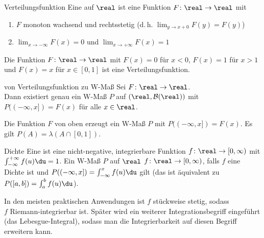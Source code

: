 \begin{Def}{Verteilungsfunktion}
    Eine  auf $\real$ ist eine Funktion
    $F\colon \real \rightarrow \real$ mit
    \begin{enumerate}
        \item
        $F$ monoton wachsend und rechtsstetig (d.\,h. $\lim_{y \to x+0} F(y) = F(y)$)

        \item
        $\lim_{x \to -\infty} F(x) = 0$ und $\lim_{x \to +\infty} F(x) = 1$
    \end{enumerate}
\end{Def}

\begin{Bsp}
    Die Funktion $F\colon \real \rightarrow \real$ mit
    $F(x) = 0$ für $x < 0$, $F(x) = 1$ für $x > 1$ und
    $F(x) = x$ für $x \in [0, 1]$ ist eine Verteilungsfunktion.
\end{Bsp}

\begin{Satz}{von Verteilungsfunktion zu W-Maß}
    Sei $F\colon \real \rightarrow \real$.\\
    Dann existiert genau ein W-Maß $P$ auf $(\real, \B(\real))$ mit $P((-\infty, x]) = F(x)$
    für alle $x \in \real$.
\end{Satz}

\begin{Bsp}
    Die Funktion $F$ von oben erzeugt ein W-Maß $P$ mit $P((-\infty, x]) = F(x)$.
    Es gilt $P(A) = \lambda(A \cap [0, 1])$.
\end{Bsp}

\linie

\begin{Def}{Dichte}
    Eine  ist eine nicht-negative, integrierbare Funktion
    $f\colon \real \rightarrow [0, \infty)$ mit $\int_{-\infty}^{+\infty} f(u)\du = 1$.
    Ein W-Maß $P$ auf $\real$ 
    $f\colon \real \rightarrow [0, \infty)$,
    falls $f$ eine Dichte ist und $P((-\infty, x]) = \int_{-\infty}^x f(u)\du$ gilt
    (das ist äquivalent zu $P([a, b]) = \int_a^b f(u)\du$).
\end{Def}

\begin{Bem}
    In den meisten praktischen Anwendungen ist $f$ stückweise stetig, sodass\\
    $f$ Riemann-integrierbar ist.
    Später wird ein weiterer Integrationsbegriff eingeführt\\
    (das Lebesgue-Integral), sodass man die Integrierbarkeit auf diesen Begriff erweitern kann.
\end{Bem}

